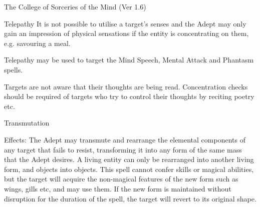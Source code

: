 \begin{Chapter}{The College of Sorceries of the Mind (Ver 1.6)}
\begin{spell}[S-9]{Telepathy }
It is not possible to utilise a target’s senses and the 
Adept  may  only  gain  an  impression  of  physical 
sensations  if  the  entity  is  concentrating  on  them, 
e.g. savouring a meal. 

Telepathy may be used to  target the Mind Speech, 
Mental Attack and Phantasm spells. 

Targets are not aware that their thoughts are being 
read.  Concentration  checks  should  be  required  of 
targets who try to control their thoughts by reciting 
poetry etc. 

\end{spell}

\begin{spell}[S-10]{Transmutation }

Effects:  The  Adept  may  transmute  and  rearrange 
the elemental components of any target that fails to 
resist,  transforming  it  into  any  form  of  the  same 
mass  that  the  Adept  desires.  A  living  entity  can 
only  be  rearranged  into  another  living  form,  and 
objects into objects. This spell cannot confer skills 
or  magical  abilities,  but  the  target  will  acquire  the 
non-magical  features  of  the  new  form  such  as 
wings, gills etc, and may use them. If the new form 
is maintained without disruption for the duration of 
the spell, the target will revert to its original shape. 
\end{spell}

\end{Chapter}
